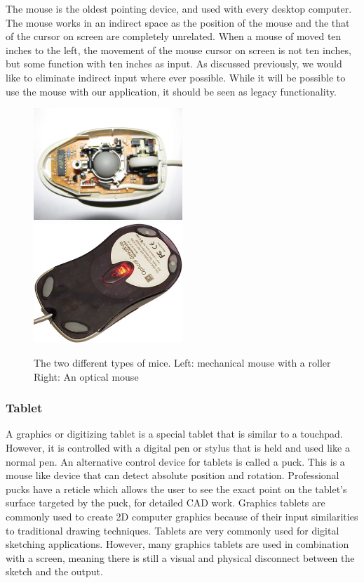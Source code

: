 \documentclass[11pt]{report}
\begin{document}
 The mouse is the oldest pointing device, and used with every desktop computer.
 The mouse works in an indirect space as the position of the mouse and the that of the cursor on screen are completely unrelated.
 When a mouse of moved ten inches to the left, the movement of the mouse cursor on screen is not ten inches, but some function with ten inches as input.
 As discussed previously, we would like to eliminate indirect input where ever possible.
 While it will be possible to use the mouse with our application, it should be seen as legacy functionality.
 
 \begin{figure}
 \includegraphics[width=0.5\textwidth]{mechmouse}
 \includegraphics[width=0.5\textwidth]{opticalmouse}
 \caption{The two different types of mice. Left: mechanical mouse with a roller Right: An optical mouse}
 \end{figure}
 
 \subsubsection{Tablet}
 A graphics or digitizing tablet is a special tablet that is similar to a touchpad. 
 However, it is controlled with a digital pen or stylus that is held and used like a normal pen.
 An alternative control device for tablets is called a puck. 
 This is a mouse like device that can detect absolute position and rotation.
 Professional pucks have a reticle which allows the user to see the exact point on the tablet's surface targeted by the puck, for detailed CAD work.
 Graphics tablets are commonly used to create 2D computer graphics because of their input similarities to traditional drawing techniques.
 Tablets are very commonly used for digital sketching applications.
 However, many graphics tablets are used in combination with a screen, meaning there is still a visual and physical disconnect between the sketch and the output.
 
\end{document}
